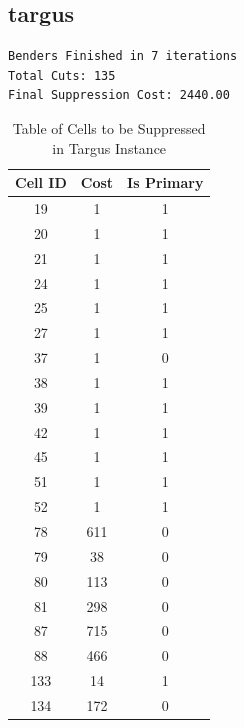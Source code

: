 \documentclass[11pt,a4paper]{article}
\begin{document}
\subsection{targus}
\begin{lstlisting}
Benders Finished in 7 iterations
Total Cuts: 135
Final Suppression Cost: 2440.00
\end{lstlisting}

\begin{table}[H]
    \centering
    \begin{tabular}{c | c | c}
        \textbf{Cell ID} & \textbf{Cost} & \textbf{Is Primary} \\
        \toprule
        19         & 1          & 1          \\
        20         & 1          & 1         \\
        21         & 1          & 1         \\
        24         & 1          & 1         \\
        25         & 1          & 1         \\

        27         & 1          & 1         \\
        37         & 1          & 0         \\
        38         & 1          & 1         \\
        39         & 1          & 1         \\
        42         & 1          & 1         \\
        
        45         & 1          & 1         \\
        51         & 1          & 1         \\
        52         & 1          & 1         \\
        78         & 611        & 0         \\
        79         & 38         & 0         \\
        
        80         & 113        & 0         \\
        81         & 298        & 0         \\
        87         & 715        & 0         \\
        88         & 466        & 0         \\
        133        & 14         & 1         \\
        
        134        & 172        & 0         \\
    \end{tabular}
    \caption{Table of Cells to be Suppressed in Targus Instance}
    \label{tab:targus-suppressed-cells}
\end{table}
\end{document}
